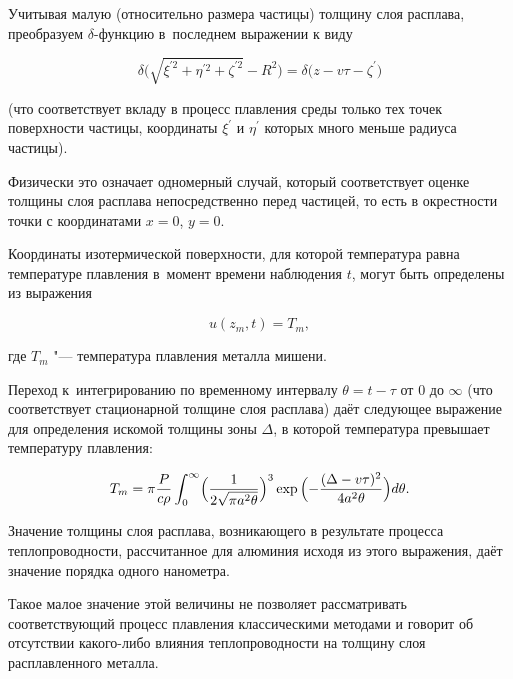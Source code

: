 Учитывая малую (относительно размера частицы) толщину слоя расплава, преобразуем $\delta $-функцию в~последнем выражении к виду

\begin{equation}

 \delta\bigl(\sqrt{\xi^{\prime2}+\eta^{\prime2}+\zeta^{\prime2}}-R^{2}\bigr)=\delta\bigl(z-v\tau-\zeta^{\prime}\bigr)  

 \end{equation}

(что соответствует вкладу в процесс плавления среды только тех точек поверхности частицы, координаты $\xi^{\prime} $ и $\eta^{\prime} $ которых много меньше радиуса частицы). 

Физически это означает одномерный случай, который соответствует оценке толщины слоя расплава непосредственно перед частицей, то есть в окрестности точки с координатами $x=0$, $y=0 $. 

Координаты изотермической поверхности, для которой температура равна температуре плавления в~момент времени наблюдения $t $,  могут быть определены из выражения

\begin{equation*}

 u(z_{m},t)=T_{m},

 \end{equation*}

где $T_{m} $ "--- температура плавления металла мишени. 

Переход к~интегрированию по временному интервалу $\theta=t-\tau $ от  $0 $ до $\infty $ (что соответствует стационарной толщине слоя расплава) даёт следующее выражение для определения искомой толщины зоны $\Delta $, в которой температура превышает температуру плавления:

\begin{equation}

T_{m}=\pi\frac{P}{c\rho} \int _{0}^{\infty} \Bigl(\frac{1}{2\sqrt{\pi a^{2}\theta}}\Bigr)^{3} \exp{\Bigl(-\frac{(\Delta-v\tau)^{2}}{4a^{2}\theta}\Bigr)}d\theta.

 \end{equation}

Значение толщины слоя расплава, возникающего в результате процесса теплопроводности, рассчитанное для алюминия исходя из этого выражения, даёт значение порядка одного нанометра. 

Такое малое значение этой величины не позволяет рассматривать соответствующий процесс плавления классическими методами и говорит об отсутствии какого-либо влияния теплопроводности на толщину слоя расплавленного  металла.



